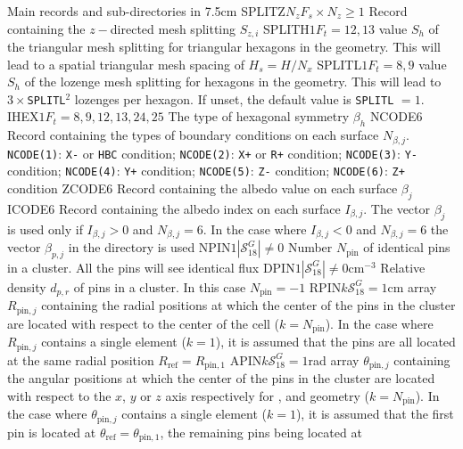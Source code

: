 \begin{DescriptionEnregistrement}{Main records and sub-directories in }{7.5cm}
\OptIntEnr
  {SPLITZ}{$N_{z}$}{$F_{s}\times N_{z}\ge 1$}
  {Record containing the $z-$directed mesh splitting $S_{z,i}$}
\OptIntEnr
  {SPLITH}{$1$}{$F_{t}=12,13$}
  {value $S_{h}$ of the triangular mesh splitting for triangular hexagons in the geometry. This will lead to a spatial triangular mesh spacing of $H_{s}=H/N_{x}$}
\OptIntEnr
  {SPLITL}{$1$}{$F_{t}=8,9$}
  {value $S_{h}$ of the lozenge mesh splitting for hexagons in the geometry. This will lead to $3 \times${\tt SPLITL}$^2$ lozenges per hexagon. If unset, the default value is {\tt SPLITL} $=1$.}
\OptIntEnr
  {IHEX}{$1$}{$F_{t}= 8,9,12,13,24,25$}
  {The type of hexagonal symmetry $\beta_{h}$}
\IntEnr
  {NCODE}{$6$}
  {Record containing the types of boundary conditions on each surface
  $N_{\beta,j}$. {\tt NCODE(1)}: {\tt X-} or {\tt HBC} condition;
  {\tt NCODE(2)}: {\tt X+} or {\tt R+} condition; {\tt NCODE(3)}: {\tt Y-}
  condition; {\tt NCODE(4)}: {\tt Y+} condition; {\tt NCODE(5)}: {\tt Z-}
  condition; {\tt NCODE(6)}: {\tt Z+} condition}
\RealEnr
  {ZCODE}{$6$}{}
  {Record containing the albedo value on each surface $\beta_{j}$}
\IntEnr
  {ICODE}{$6$}
  {Record containing the albedo index on each surface $I_{\beta,j}$. 
   The vector $\beta_{j}$ is used only if $I_{\beta,j}>0$ and $N_{\beta,j}=6$. In the case where
   $I_{\beta,j}<0$ and $N_{\beta,j}=6$ the
   vector $\beta_{p,j}$ in the directory  is used} 
\OptIntEnr
  {NPIN}{$1$}{$|\mathcal{S}^{G}_{18}|\ne 0$}
  {Number $N_{\text{pin}}$ of identical pins in a cluster. All the pins will see identical flux}
\OptRealEnr
  {DPIN}{$1$}{$|\mathcal{S}^{G}_{18}|\ne 0$}{cm$^{-3}$}
  {Relative density $d_{p,r}$ of pins in a cluster. In this case $N_{\text{pin}}=-1$}
\OptRealEnr
  {RPIN}{$k$}{$\mathcal{S}^{G}_{18}=1$}{cm}
  {array $R_{\text{pin},j}$ containing the radial positions at which the center of the pins in the cluster are located with respect to the center of the cell ($k=N_{\text{pin}}$). In the case where
   $R_{\text{pin},j}$ contains a single element ($k=1$), it is assumed that the pins are all located at the same radial position $R_{\text{ref}}=R_{\text{pin},1}$}
\OptRealEnr
  {APIN}{$k$}{$\mathcal{S}^{G}_{18}=1$}{rad}
  {array $\theta_{\text{pin},j}$ containing the angular positions at which the center of the pins in the cluster are located with respect to the $x$, $y$ or $z$ axis
respectively for ,  and  geometry ($k=N_{\text{pin}}$). In the case where
   $\theta_{\text{pin},j}$ contains a single element ($k=1$), it is assumed that the first pin is located at $\theta_{\text{ref}}=\theta_{\text{pin},1}$, the remaining pins being located at
}
\end{DescriptionEnregistrement}
